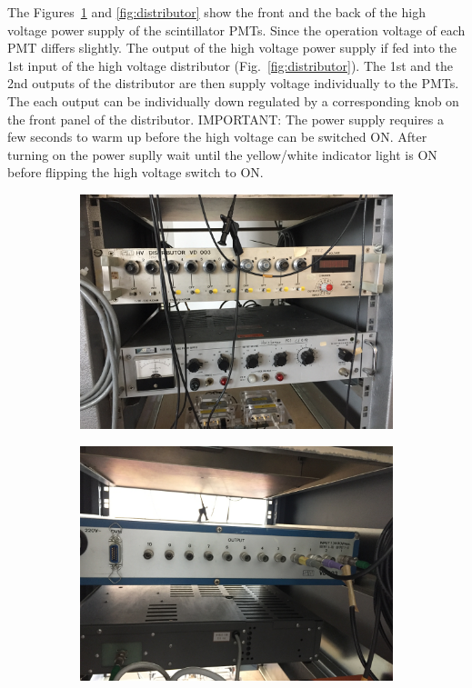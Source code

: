 \documentclass[12pt]{article}
\begin{document}
The Figures~\ref{fig:power_supply_front} and \ref{fig:distributor} show the front and the back of the high voltage power supply of the scintillator PMTs. Since the operation voltage of each PMT differs slightly. The output of the high voltage power supply if fed into the 1st input of the high voltage distributor (Fig.~\ref{fig:distributor}). The 1st and the 2nd outputs of the distributor are then supply voltage individually to the PMTs. The each output can be individually down regulated by a corresponding knob on the front panel of the distributor. IMPORTANT: The power supply requires a few seconds to warm up before the high voltage can be switched ON. After turning on the power suplly wait until the yellow/white indicator light is ON before flipping the high voltage switch to ON.

\begin{figure}
	\centering
		\begin{subfigure}[b]{0.8\textwidth}
				\includegraphics[width=1\linewidth]{pics/power_supply_distributor_front.jpg}
				\caption{}
				\label{fig:power_supply_front}
		\end{subfigure}
		\begin{subfigure}[b]{0.8\textwidth}
			\includegraphics[width=1\linewidth]{pics/distributor_back.jpg}

\end{subfigure}
\end{figure}
\end{document}
